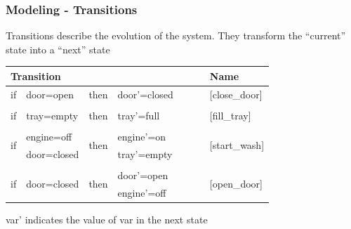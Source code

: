 \begin{frame}
  \frametitle{Modeling - Transitions}

  Transitions describe the evolution of the system. They transform
  the ``current'' state into a ``next'' state
  \vfill\pause
  \begin{center}
  \begin{tabular}{llllcl}
    \hline
    \multicolumn{4}{l}{Transition}   & ~~~ & Name \\
    \hline
    if & door=open  & then & door'=closed & & [close\_door] \\
    \\
    if & tray=empty & then & tray'=full   & & [fill\_tray] \\
    \\
    \multirow{2}{*}{if} & engine=off  & \multirow{2}{*}{then} & engine'=on  & & \multirow{2}{*}{[start\_wash]} \\ 
                        & door=closed &                       & tray'=empty & &                              \\
    \\
    \multirow{2}{*}{if} & \multirow{2}{*}{door=closed} & \multirow{2}{*}{then} & door'=open  & & \multirow{2}{*}{[open\_door]} \\ 
                        &                              &                       & engine'=off & &                             \\
    \hline
  \end{tabular}
  \end{center}
  \vfill
  var' indicates the value of var in the next state

\end{frame}

